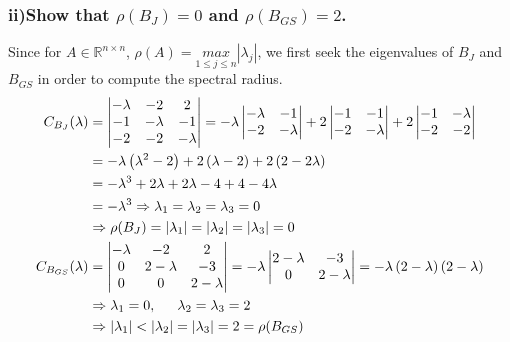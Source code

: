 \documentclass[11pt, letterpaper]{article}
\begin{document}
\subsubsection*{ii)\normalfont Show that $\rho\left(B_J\right)=0$ and $\rho\left(B_{GS}\right)=2$.}
Since for $A\in\mathbb{R}^{n\times n}$, $\rho(A)=\underset{1\leq j\leq n}{max}|\lambda_j|$, we first 
seek the eigenvalues of $B_J$ and $B_{GS}$ in order to compute the spectral radius. 
\begin{align*}
    C_{B_J}(\lambda)&=
    \begin{vmatrix}
        -\lambda & -2 & 2\\
        -1 & -\lambda & -1\\
        -2 & -2 & -\lambda 
    \end{vmatrix}
    =-\lambda
    \begin{vmatrix}
        -\lambda & -1\\
        -2 & -\lambda
    \end{vmatrix}
    +2
    \begin{vmatrix}
        -1 & -1\\
        -2 & -\lambda
    \end{vmatrix}
    +2
    \begin{vmatrix}
        -1 & -\lambda\\
        -2 & -2
    \end{vmatrix}\\
    &=-\lambda\left(\lambda^2-2\right)+2\left(\lambda - 2\right)+2\left(2-2\lambda\right)\\
    &=-\lambda^3+2\lambda+2\lambda-4+4-4\lambda\\
    &=-\lambda^3\Rightarrow \lambda_1=\lambda_2=\lambda_3=0\\
    &\Rightarrow \rho(B_J)=|\lambda_1|=|\lambda_2|=|\lambda_3|=0\\
    C_{B_{GS}}(\lambda)&=
    \begin{vmatrix}
        -\lambda & -2 & 2\\
        0 & 2-\lambda & -3\\
        0 & 0 & 2-\lambda
    \end{vmatrix}
    =-\lambda
    \begin{vmatrix}
        2-\lambda & -3\\
        0 & 2-\lambda
    \end{vmatrix}
    =-\lambda\left(2-\lambda\right)\left(2-\lambda\right)\\
    &\Rightarrow \lambda_1=0,\indent\lambda_2=\lambda_3=2\\
    &\Rightarrow |\lambda_1|<|\lambda_2|=|\lambda_3|=2=\rho(B_{GS})
\end{align*}
\end{document}
